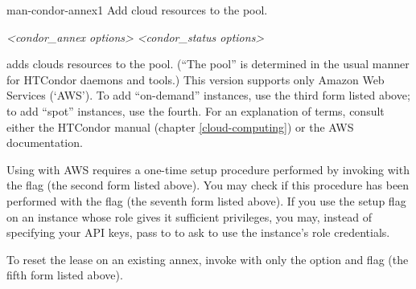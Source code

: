 \begin{ManPage}{}{man-condor-annex}{1}
{Add cloud resources to the pool.}

\Synopsis

 

  

 

 



 

 \emph{<condor\_annex options>}  \emph{<condor\_status options>}

\Description

 adds clouds resources to the pool.  (``The pool'' is determined
in the usual manner for HTCondor daemons and tools.)  This version supports
only Amazon Web Services (`AWS').  To add ``on-demand'' instances, use
the third form listed above; to add ``spot'' instances, use the fourth.  For an
explanation of terms, consult either the HTCondor manual
(chapter \ref{cloud-computing}) or the AWS documentation.

Using  with AWS requires a one-time setup procedure
performed by invoking  with the  flag
(the second form listed above).  You may check if this procedure has been
performed with the  flag (the seventh form listed above).
If you use the setup flag on an instance whose role gives it sufficient
privileges, you may, instead of specifying your API keys, pass
 to  to ask  to use the
instance's role credentials.

To reset the lease on an existing annex, invoke  with
only the  option and  flag (the fifth form
listed above).


\end{ManPage}
